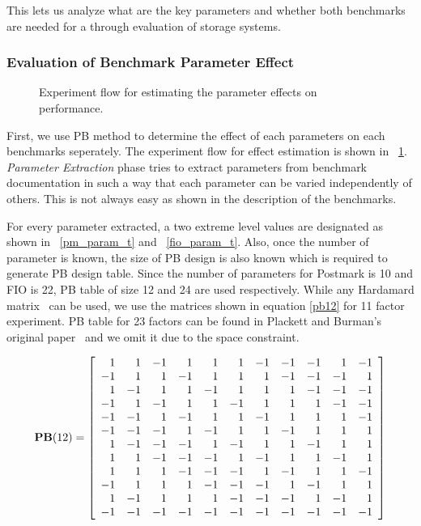  This lets us analyze what are the key parameters and whether both benchmarks are needed for a through evaluation of storage systems.

\subsubsection{Evaluation of Benchmark Parameter Effect}

\begin{figure}[!t]
\centering

\captionsetup{format=myformat}
\caption{Experiment flow for estimating the parameter effects on performance.}
\label{pb_flow_t}
\end{figure}

First, we use PB method to determine the effect of each parameters on each benchmarks seperately. 
The experiment flow for effect estimation is shown in \figurename~\ref{pb_flow_t}. 
\emph{Parameter Extraction} phase tries to extract parameters from benchmark documentation in such a way that each parameter can be varied independently of others. 
This is not always easy as shown in the description of the benchmarks. 

For every parameter extracted, a two extreme level values are designated as shown in \tablename~\ref{pm_param_t} and \tablename~\ref{fio_param_t}. 
Also, once the number of parameter is known, the size of PB design is also known which is required to generate PB design table.  
Since the number of parameters for Postmark is 10 and FIO is 22, PB table of size 12 and 24 are used respectively. 
While any Hardamard matrix~\cite{hadamar:1954} can be used, we use the matrices shown in equation \ref {pb12} for 11 factor experiment.  
PB table for 23 factors can be found in Plackett and Burman's original paper~\cite{plackett:1946} and we omit it due to the space constraint. 

\begin{equation}\label{pb12}
\mathbf{PB}(12)=
\left [ {\begin{array}{r r r r r r r r r r r}
  1&  1& -1&  1&  1&  1& -1& -1& -1&  1& -1\\
 -1&  1&  1& -1&  1&  1&  1& -1& -1& -1&  1\\
  1& -1&  1&  1& -1&  1&  1&  1& -1& -1& -1\\
 -1&  1& -1&  1&  1& -1&  1&  1&  1& -1& -1\\
 -1& -1&  1& -1&  1&  1& -1&  1&  1&  1& -1\\
 -1& -1& -1&  1& -1&  1&  1& -1&  1&  1&  1\\
  1& -1& -1& -1&  1& -1&  1&  1& -1&  1&  1\\
  1&  1& -1& -1& -1&  1& -1&  1&  1& -1&  1\\
  1&  1&  1& -1& -1& -1&  1& -1&  1&  1& -1\\
 -1&  1&  1&  1& -1& -1& -1&  1& -1&  1&  1\\
  1& -1&  1&  1&  1& -1& -1& -1&  1& -1&  1\\
 -1& -1& -1& -1& -1& -1& -1& -1& -1& -1& -1\\
\end{array}} \right ] 
\end{equation}

